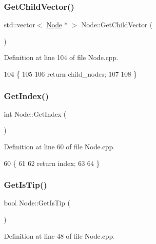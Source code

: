 \subsubsection{\texorpdfstring{Get\+Child\+Vector()}{GetChildVector()}}
{\footnotesize\ttfamily std\+::vector$<$ \hyperlink{classNode}{Node} $\ast$ $>$ Node\+::\+Get\+Child\+Vector (\begin{DoxyParamCaption}{ }\end{DoxyParamCaption})}



Definition at line 104 of file Node.\+cpp.


\begin{DoxyCode}
104                                      \{
105   
106   \textcolor{keywordflow}{return} child\_nodes;
107   
108 \}
\end{DoxyCode}
\mbox{\label{classNode_a90ff01054aa65ec8338b78a792ea4bfe}} 
\subsubsection{\texorpdfstring{Get\+Index()}{GetIndex()}}
{\footnotesize\ttfamily int Node\+::\+Get\+Index (\begin{DoxyParamCaption}{ }\end{DoxyParamCaption})}



Definition at line 60 of file Node.\+cpp.


\begin{DoxyCode}
60                   \{
61   
62   \textcolor{keywordflow}{return} index;
63   
64 \}
\end{DoxyCode}
\mbox{\label{classNode_ac2902fa01a9ebbeb692fe16d75bd6be2}} 
\subsubsection{\texorpdfstring{Get\+Is\+Tip()}{GetIsTip()}}
{\footnotesize\ttfamily bool Node\+::\+Get\+Is\+Tip (\begin{DoxyParamCaption}{ }\end{DoxyParamCaption})}



Definition at line 48 of file Node.\+cpp.


